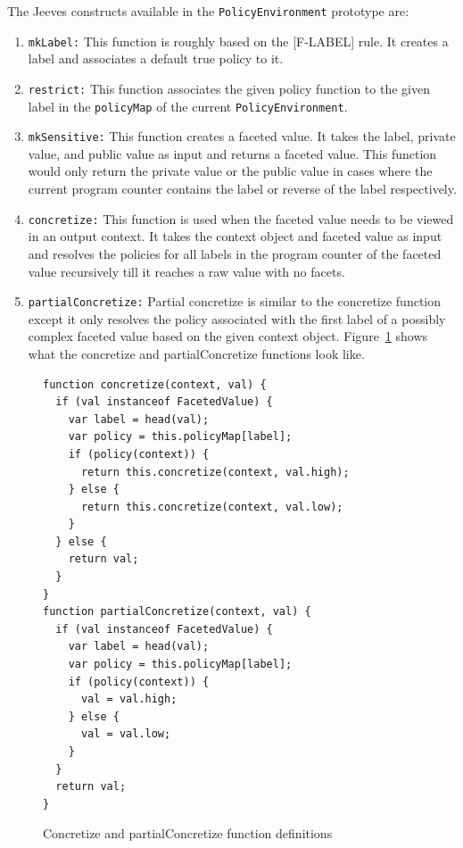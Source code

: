 The Jeeves constructs available in the \texttt{PolicyEnvironment} prototype are:
\begin{enumerate}
  \item \texttt{mkLabel:} This function is roughly based on the [F-LABEL] rule. It
    creates a label and associates a default true policy to it.
  \item \texttt{restrict:} This function associates the given policy function to the
  given label in the \texttt{policyMap} of the current \texttt{PolicyEnvironment}.
  \item \texttt{mkSensitive:} This function creates a faceted value. It takes the
  label, private value, and public value as input and returns a faceted value. This
  function would only return the private value or the public value in cases where
  the current program counter contains the label or reverse of the label respectively.
  \item \texttt{concretize:} This function is used when the faceted value needs to
  be viewed in an output context. It takes the context object and faceted value
  as input and resolves the policies for all labels in the program counter of
  the faceted value recursively till it reaches a raw value with no facets.
  \item \texttt{partialConcretize:} Partial concretize is similar to the concretize
  function except it only resolves the policy associated with the first label of
  a possibly complex faceted value based on the given context object.
  Figure~\ref{fig:concretize} shows what the concretize and partialConcretize
  functions look like.
\end{enumerate}

\begin{figure}
  \begin{lstlisting}
function concretize(context, val) {
  if (val instanceof FacetedValue) {
    var label = head(val);
    var policy = this.policyMap[label];
    if (policy(context)) {
      return this.concretize(context, val.high);
    } else {
      return this.concretize(context, val.low);
    }
  } else {
    return val;
  }
}
function partialConcretize(context, val) {
  if (val instanceof FacetedValue) {
    var label = head(val);
    var policy = this.policyMap[label];
    if (policy(context)) {
      val = val.high;
    } else {
      val = val.low;
    }
  }
  return val;
}
  \end{lstlisting}
  \caption{Concretize and partialConcretize function definitions}
  \label{fig:concretize}
\end{figure}

